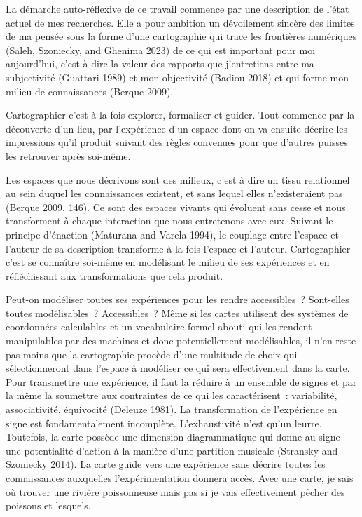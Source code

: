 \documentclass[
  letterpaper,
  DIV=11,
  numbers=noendperiod]{scrreprt}
\begin{document}
La démarche auto-réflexive de ce travail commence par une description de
l'état actuel de mes recherches. Elle a pour ambition un dévoilement
sincère des limites de ma pensée sous la forme d'une cartographie qui
trace les frontières numériques (Saleh, Szoniecky, and Ghenima 2023) de
ce qui est important pour moi aujourd'hui, c'est-à-dire la valeur des
rapports que j'entretiens entre ma subjectivité (Guattari 1989) et mon
objectivité (Badiou 2018) et qui forme mon milieu de connaissances
(Berque 2009).

Cartographier c'est à la fois explorer, formaliser et guider. Tout
commence par la découverte d'un lieu, par l'expérience d'un espace dont
on va ensuite décrire les impressions qu'il produit suivant des règles
convenues pour que d'autres puisses les retrouver après soi-même.

Les espaces que nous décrivons sont des milieux, c'est à dire un tissu
relationnel au sein duquel les connaissances existent, et sans lequel
elles n'existeraient pas (Berque 2009, 146). Ce sont des espaces vivants
qui évoluent sans cesse et nous transforment à chaque interaction que
nous entretenons avec eux. Suivant le principe d'énaction (Maturana and
Varela 1994), le couplage entre l'espace et l'auteur de sa description
transforme à la fois l'espace et l'auteur. Cartographier c'est se
connaître soi-même en modélisant le milieu de ses expériences et en
réfléchissant aux transformations que cela produit.

Peut-on modéliser toutes ses expériences pour les rendre accessibles~?
Sont-elles toutes modélisables~? Accessibles~? Même si les cartes
utilisent des systèmes de coordonnées calculables et un vocabulaire
formel abouti qui les rendent manipulables par des machines et donc
potentiellement modélisables, il n'en reste pas moins que la
cartographie procède d'une multitude de choix qui sélectionneront dans
l'espace à modéliser ce qui sera effectivement dans la carte. Pour
transmettre une expérience, il faut la réduire à un ensemble de signes
et par la même la soumettre aux contraintes de ce qui les
caractérisent~: variabilité, associativité, équivocité (Deleuze 1981).
La transformation de l'expérience en signe est fondamentalement
incomplète. L'exhaustivité n'est qu'un leurre. Toutefois, la carte
possède une dimension diagrammatique qui donne au signe une potentialité
d'action à la manière d'une partition musicale (Stransky and Szoniecky
2014). La carte guide vers une expérience sans décrire toutes les
connaissances auxquelles l'expérimentation donnera accès. Avec une
carte, je sais où trouver une rivière poissonneuse mais pas si je vais
effectivement pêcher des poissons et lesquels.
\end{document}
